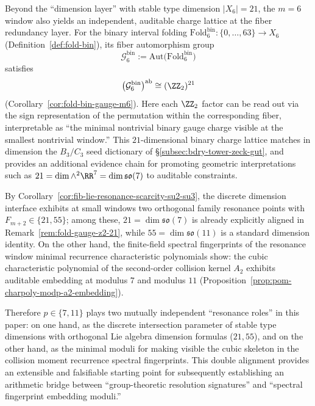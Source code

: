 \begin{remark}[The \texorpdfstring{$(\ZZ_2)^{21}$}{(Z2)\^21} binary charge lattice of the fold-gauge (\texorpdfstring{$m=6$}{m=6}, dyadic readout)]\label{rem:fold-gauge-z2-21}
Beyond the ``dimension layer'' with stable type dimension \(|X_6|=21\), the \(m=6\) window also yields an independent, auditable charge lattice at the fiber redundancy layer.
For the binary interval folding \(\mathrm{Fold}^{\mathrm{bin}}_6:\{0,\dots,63\}\to X_6\) (Definition~\ref{def:fold-bin}), its fiber automorphism group
\[
\mathcal{G}^{\mathrm{bin}}_6:=\mathrm{Aut}\!\bigl(\mathrm{Fold}^{\mathrm{bin}}_6\bigr)
\]
satisfies
\[
\bigl(\mathcal{G}^{\mathrm{bin}}_6\bigr)^{\mathrm{ab}}\cong (\ZZ_2)^{21}
\]
(Corollary~\ref{cor:fold-bin-gauge-m6}).
Here each \(\ZZ_2\) factor can be read out via the sign representation of the permutation within the corresponding fiber, interpretable as ``the minimal nontrivial binary gauge charge visible at the smallest nontrivial window.''
This \(21\)-dimensional binary charge lattice matches in dimension the \(B_3/C_3\) seed dictionary of \S\ref{subsec:bdry-tower-zeck-gut}, and provides an additional evidence chain for promoting geometric interpretations such as
\(
21=\dim\wedge^2\RR^7=\dim\mathfrak{so}(7)
\)
to auditable constraints.
\end{remark}

\begin{remark}\label{rem:fib-lie-primes-7-11-double-alignment}
By Corollary~\ref{cor:fib-lie-resonance-scarcity-su2-su3}, the discrete dimension interface exhibits at small windows two orthogonal family resonance points with \(F_{m+2}\in\{21,55\}\);
among these, \(21=\dim\mathfrak{so}(7)\) is already explicitly aligned in Remark~\ref{rem:fold-gauge-z2-21}, while \(55=\dim\mathfrak{so}(11)\) is a standard dimension identity.
On the other hand, the finite-field spectral fingerprints of the resonance window minimal recurrence characteristic polynomials show: the cubic characteristic polynomial of the second-order collision kernel \(A_2\) exhibits auditable embedding at modulus \(7\) and modulus \(11\) (Proposition~\ref{prop:pom-charpoly-modp-a2-embedding}).
\par
Therefore \(p\in\{7,11\}\) plays two mutually independent ``resonance roles'' in this paper: on one hand, as the discrete intersection parameter of stable type dimensions with orthogonal Lie algebra dimension formulas (\(21,55\)), and on the other hand, as the minimal moduli for making visible the cubic skeleton in the collision moment recurrence spectral fingerprints.
This double alignment provides an extensible and falsifiable starting point for subsequently establishing an arithmetic bridge between ``group-theoretic resolution signatures'' and ``spectral fingerprint embedding moduli.''
\end{remark}
